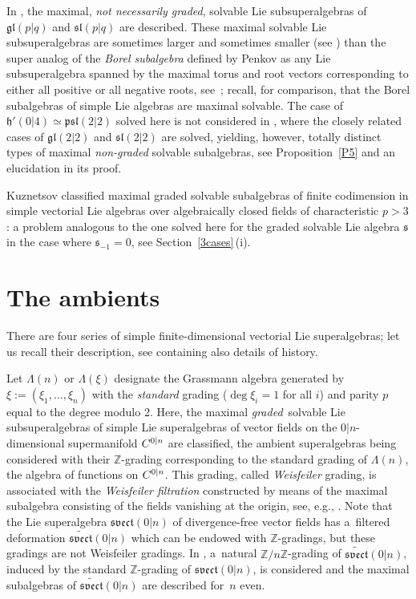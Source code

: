 \documentclass[10pt,a4paper]{amsart}
\newcommand {\Zee} {{\mathbb Z}}
\newcommand {\fgl} {{\mathfrak{gl}}} %
\newcommand {\fh} {{\mathfrak{h}}}
\newcommand {\fpsl} {{\mathfrak{psl}}}
\newcommand {\fs} {{\mathfrak{s}}}
\newcommand {\fsl} {{\mathfrak{sl}}}
\newcommand {\fsvect} {{\mathfrak{svect}}}
\let\cal\relax
\newcommand {\cal} {\mathcal}
\newcommand {\cC} {{\cal C}}
\newcommand {\<} [2] {{\left.\vphantom{#2}\right.^{#1\!}\!{#2}}}
\numberwithin{equation}{section}
\begin{document}
In \cite{S2}, the maximal, \textit{not necessarily graded}, solvable Lie subsuperalgebras of $\fgl(p|q)$ and $\fsl(p|q)$ are described. These maximal solvable Lie subsuperalgebras are sometimes larger and sometimes smaller (see \cite[Theorem~3]{S2}) than the super analog of the \textit{Borel subalgebra} defined by Penkov as any Lie subsuperalgebra spanned by the maximal torus and root vectors corresponding to either all positive or all negative roots, see~\cite{P}; recall, for comparison, that the Borel subalgebras of simple Lie algebras are maximal solvable. The case of $\fh'(0|4)\simeq \fpsl(2|2)$ solved here is not considered in \cite{S2}, where the closely related cases of $\fgl(2|2)$ and $\fsl(2|2)$ are solved, yielding, however, totally distinct types of maximal \textit{non-graded} solvable subalgebras, see Proposition~\ref{P5} and an elucidation in its proof.

Kuznetsov \cite{Ku} classified maximal graded solvable subalgebras of finite codimension in simple vectorial Lie algebras over algebraically closed fields of characteristic $p>3$: a problem analogous to the one solved here for the graded solvable Lie algebra $\fs$ in the case where $\fs_{-1}=0$, see Section~\ref{3cases}\,(i).

\section{The ambients} There are four series of simple finite-dimensional vectorial Lie superalgebras; let us recall their description, see \cite{Lo} containing also details of history.

Let $\Lambda(n)$ or $\Lambda(\xi)$ designate the Grassmann algebra generated by $\xi:=(\xi_1, \dots, \xi_n)$ with the \textit{standard} grading ($\deg \xi_i=1$ for all $i$) and parity $p$ equal to the degree modulo 2. Here, the maximal \textit{graded}\, solvable Lie subsuperalgebras of simple Lie superalgebras of vector fields on the $0|n$-dimensional supermanifold $\cC^{0|n}$ are classified, the ambient superalgebras being considered with their $\Zee$-grading corresponding to the standard grading of $\Lambda(n)$, the algebra of functions on $\cC^{0|n}$. This grading, called \textit{Weisfeiler} grading, is associated with the \textit{Weisfeiler filtration} constructed by means of the maximal subalgebra consisting of the fields vanishing at the origin, see, e.g., \cite{BGLLS}. Note that the Lie superalgebra $\fsvect(0|n)$ of divergence-free vector fields has a~filtered deformation $\widetilde{\fsvect}(0|n)$ which can be endowed with $\Zee$-gradings, but these gradings are not Weisfeiler gradings. In \cite{BLM}, a~natural $\Zee/n\Zee$-grading of $\widetilde{\fsvect}(0|n)$, induced by the standard $\Zee$-grading of $\fsvect(0|n)$, is considered and the maximal subalgebras of $\widetilde{\fsvect}(0|n)$ are described for~$n$ even.
\end{document}
